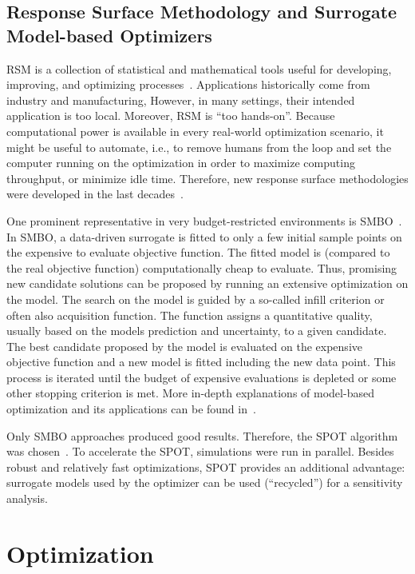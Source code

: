\documentclass[conference]{IEEEtran}
\begin{document}
\subsection{Response Surface Methodology and Surrogate Model-based Optimizers}\label{sec:rsm}
\gls{RSM} is a collection of statistical and mathematical tools useful for developing, improving, and optimizing processes~\citep{Myers2016}. 
Applications historically come from industry and manufacturing, 
However, in many settings, their intended application is too local. Moreover, \gls{RSM} is ``too hands-on''.
Because computational power is available in every real-world optimization scenario, 
it might be useful to automate, i.e., to remove humans from the loop and set the computer running on the optimization in order to maximize computing throughput, or minimize idle time. 
Therefore, new response surface methodologies were developed in the last decades~\citep{Gram20a}.
 
 One prominent representative in very budget-restricted environments is \gls{SMBO}~\citep{Jin11a}.
In \gls{SMBO}, a data-driven surrogate is fitted to only a few initial sample points on the expensive to evaluate objective function. 
The fitted model is (compared to the real objective function) computationally cheap to evaluate.
Thus, promising new candidate solutions can be proposed by running an extensive optimization on the model.
The search on the model is guided by a so-called infill criterion or often also acquisition function.
The function assigns a quantitative quality, usually based on the models prediction and uncertainty, to a given candidate.
The best candidate proposed by the model is evaluated on the expensive objective function and a new model is fitted including the new data point.
This process is iterated until the budget of expensive evaluations is depleted or some other stopping criterion is met. More in-depth explanations of model-based optimization and its applications can be found in~\citet{Quei05a, EGOB02, Jin19a}.

Only \gls{SMBO} approaches produced good results. 
Therefore, the \gls{SPOT} algorithm was chosen~\citep{Bart17parxiv}.
To accelerate the \gls{SPOT}, simulations were run in parallel.
Besides robust and relatively fast optimizations, \gls{SPOT} provides an additional advantage: surrogate models used by the optimizer can be used (``recycled'') for a sensitivity analysis. 

\section{Optimization}\label{sec:sa}
\end{document}
